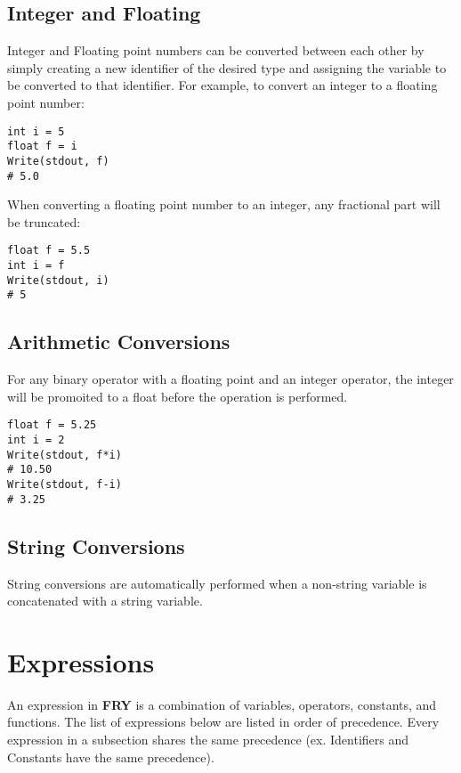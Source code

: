 \documentclass{article}
\begin{document}
\subsection{Integer and Floating}
Integer and Floating point numbers can be converted between each other by simply creating a new identifier of the desired type and assigning the variable to be converted to that identifier. For example, to convert an integer to a floating point number:
\begin{lstlisting}
int i = 5
float f = i
Write(stdout, f)
# 5.0
\end{lstlisting}
When converting a floating point number to an integer, any fractional part will be truncated:
\begin{lstlisting}
float f = 5.5
int i = f
Write(stdout, i)
# 5
\end{lstlisting}
\subsection{Arithmetic Conversions}
For any binary operator with a floating point and an integer operator, the integer will be promoited to a float before the operation is performed.
\begin{lstlisting}
float f = 5.25
int i = 2
Write(stdout, f*i)
# 10.50
Write(stdout, f-i)
# 3.25
\end{lstlisting}
\subsection{String Conversions}
String conversions are automatically performed when a non-string variable is concatenated with a string variable. 

\section{Expressions}
\label{sec:expr}
An expression in \textbf{FRY} is a combination of variables, operators, constants, and functions. The list of expressions below are listed in order of precedence. Every expression in a subsection shares the same precedence (ex. Identifiers and Constants have the same precedence).
\end{document}
